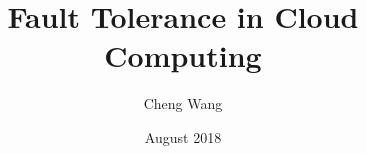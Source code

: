 \documentclass[phd,12pt]{hkuthesis}
\title{Fault Tolerance in Cloud Computing}
\author{Cheng Wang}
\date{August 2018}
\begin{document}
\begin{frontmatter}
	\abstract[200]		%
	\titlepage
	\dedication 		%
	\declaration
	\acknowledgements	%
	\tableofcontents
	\listoffigures		%
	\listoftables		%
\end{frontmatter}

\begin{chapters}
	
	
\end{chapters}

\begin{appendices}
	
	
\end{appendices}

\begin{backmatter}
	\printbibliography[heading=bibintoc,title=References]
\end{backmatter}
\end{document}
